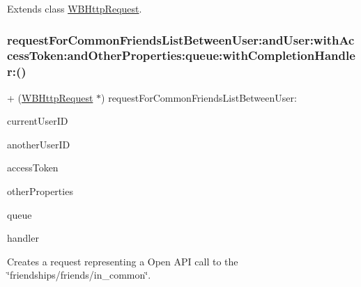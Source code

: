 Extends class \mbox{\hyperlink{interface_w_b_http_request_a869234d6cc01353dcfc8f0f47ad06f5c}{W\+B\+Http\+Request}}.

\mbox{\label{category_w_b_http_request_07_weibo_user_08_a869234d6cc01353dcfc8f0f47ad06f5c}} 
\subsubsection{\texorpdfstring{request\+For\+Common\+Friends\+List\+Between\+User\+:and\+User\+:with\+Access\+Token\+:and\+Other\+Properties\+:queue\+:with\+Completion\+Handler\+:()}{requestForCommonFriendsListBetweenUser:andUser:withAccessToken:andOtherProperties:queue:withCompletionHandler:()}\hspace{0.1cm}{\footnotesize\ttfamily [2/3]}}
{\footnotesize\ttfamily + (\mbox{\hyperlink{interface_w_b_http_request}{W\+B\+Http\+Request}} $\ast$) request\+For\+Common\+Friends\+List\+Between\+User\+: \begin{DoxyParamCaption}\item[{(N\+S\+String $\ast$)}]{current\+User\+ID }\item[{andUser:(N\+S\+String $\ast$)}]{another\+User\+ID }\item[{withAccessToken:(N\+S\+String $\ast$)}]{access\+Token }\item[{andOtherProperties:(N\+S\+Dictionary $\ast$)}]{other\+Properties }\item[{queue:(N\+S\+Operation\+Queue $\ast$)}]{queue }\item[{withCompletionHandler:(W\+B\+Request\+Handler)}]{handler }\end{DoxyParamCaption}}

Creates a request representing a Open A\+PI call to the \char`\"{}friendships/friends/in\+\_\+common\char`\"{}.

